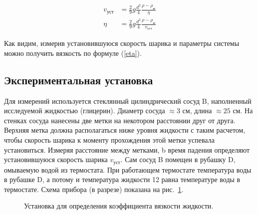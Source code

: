 \documentclass[a4paper, 12pt]{article}
\begin{document}
    \begin{align}
        v_{уст}&=\frac{2}{9}g\frac{d^2}{4}\frac{\rho - \rho_ж}{\eta}\label{v_ust}\\
        \eta&=\frac{2}{9}g\frac{d^2}{4}\frac{\rho - \rho_ж}{v_{уст}}\label{eta}
    \end{align}

    Как видим, измерив установившуюся скорость шарика и параметры системы можно получить вязкость по формуле (\ref{eta}).

    \subsection{Экспериментальная установка}
    Для измерений используется стеклянный цилиндрический сосуд B, наполненный исследуемой жидкостью (глицерин). Диаметр сосуда $\approx 3$ см, длина $\approx 25$ см. На стенках сосуда нанесены две метки на некотором расстоянии друг от друга. Верхняя метка должна располагаться ниже уровня жидкости с таким расчетом, чтобы скорость шарика к моменту прохождения этой метки успевала установиться. Измеряя расстояние между метками, b время падения определяют установившуюся скорость шарика $v_{уст}$. Сам сосуд B помещен в рубашку D, омываемую водой из термостата. При работающем термостате температура воды в рубашке D, а потому и температура жидкости 12 равна температуре воды в термостате.
    Схема прибора (в разрезе) показана на рис.~\ref{ustanovka}.
    \begin{figure}[ht]
        \caption{Установка для определения коэффициента вязкости жидкости.}
        \label{ustanovka}
    \end{figure}
\end{document}
